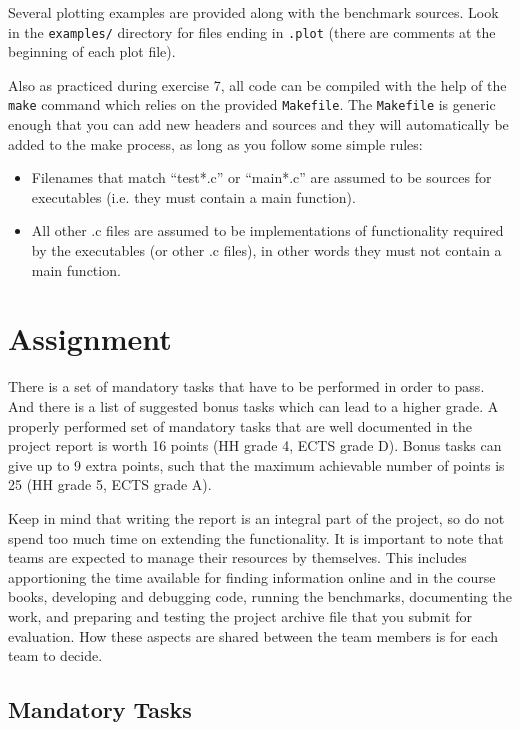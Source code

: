 \documentclass[a4paper,10pt]{article}
\begin{document}
Several plotting examples are provided along with the benchmark sources.
Look in the \texttt{examples/} directory for files ending in \texttt{.plot} (there are comments at the beginning of each plot file).

Also as practiced during exercise 7, all code can be compiled with the help of the \texttt{make} command which relies on the provided \texttt{Makefile}.
The \texttt{Makefile} is generic enough that you can add new headers and sources and they will automatically be added to the make process, as long as you follow some simple rules:

\begin{itemize}
\item
  Filenames that match ``test*.c'' or ``main*.c'' are assumed to be sources for executables (i.e. they must contain a main function).
\item
  All other .c files are assumed to be implementations of functionality required by the executables (or other .c files), in other words they must not contain a main function.
\end{itemize}



\section{Assignment}

There is a set of mandatory tasks that have to be performed in order to pass.
And there is a list of suggested bonus tasks which can lead to a higher grade.
A properly performed set of mandatory tasks that are well documented in the project report is worth 16 points (HH grade 4, ECTS grade D).
Bonus tasks can give up to 9 extra points, such that the maximum achievable number of points is 25 (HH grade 5, ECTS grade A).

Keep in mind that writing the report is an integral part of the project, so do not spend too much time on extending the functionality.
It is important to note that teams are expected to manage their resources by themselves.
This includes apportioning the time available for finding information online and in the course books, developing and debugging code, running the benchmarks, documenting the work, and preparing and testing the project archive file that you submit for evaluation.
How these aspects are shared between the team members is for each team to decide.

\subsection{Mandatory Tasks}
\end{document}
